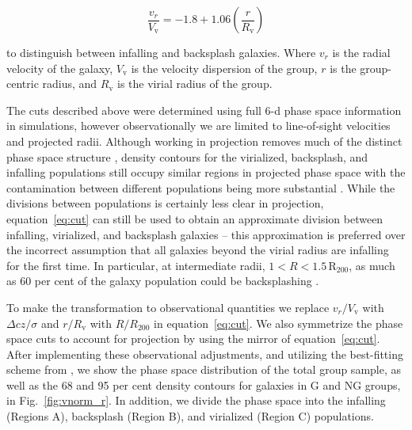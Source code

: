 \documentclass[a4paper,fleqn,usenatbib]{mnras}
\begin{document}
\begin{equation} \label{eq:cut}
  \frac{v_r}{V_\mathrm{v}} = -1.8 + 1.06
  \left(\frac{r}{R_\mathrm{v}}\right)
\end{equation}

\noindent
to distinguish between infalling and backsplash galaxies.  Where $v_r$
is the radial velocity of the galaxy, $V_\mathrm{v}$ is the velocity
dispersion of the group, $r$ is the group-centric radius, and
$R_\mathrm{v}$ is the virial radius of the group.
\par
The cuts described above were determined using full 6-d phase space
information in simulations, however observationally we are limited to
line-of-sight
velocities and projected radii.  Although working in projection
removes much of the distinct phase space structure \citep{oman2013, haines2015},
density contours for the virialized, backsplash, and infalling
populations still occupy similar regions in projected phase space
with the contamination between different populations being more substantial
\citep{mahajan2011}.  While the divisions between populations is
certainly less clear in projection, equation~\ref{eq:cut} can still be
used to obtain an approximate division between infalling, virialized,
and backsplash galaxies -- this approximation is preferred over
the incorrect assumption that all galaxies beyond the virial radius
are infalling for the first time.  In particular, at intermediate
radii, $1 < R < 1.5\,\mathrm{R_{200}}$, as much as 60 per cent of the
galaxy population could be backsplashing \citep{mahajan2011, hou2014}.
\par
To make the transformation to observational quantities we replace
$v_r/V_\mathrm{v}$ with $\Delta cz/\sigma$ and $r/R_\mathrm{v}$ with
$R/R_{200}$ in equation~\ref{eq:cut}.  We also symmetrize the phase
space cuts to account for projection by using the mirror of
equation~\ref{eq:cut}.  After implementing these observational
adjustments, and utilizing the best-fitting scheme from
\citet{mahajan2011}, we show the phase space distribution of the total
group sample, as well as the 68 and 95 per cent density contours for galaxies
in G and NG groups, in
Fig.~\ref{fig:vnorm_r}.  In addition, we divide the phase space into
the infalling (Regions A), backsplash (Region B), and 
virialized (Region C) populations. 

\end{document}
